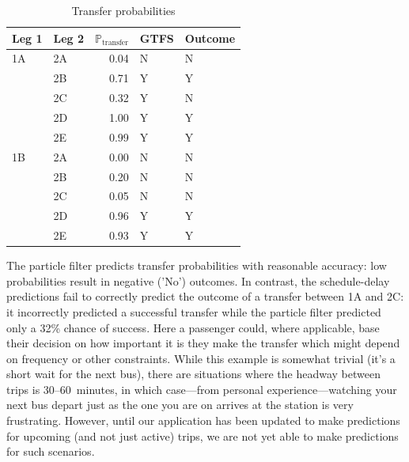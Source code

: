 \begin{knitrout}\small
{}\color{fgcolor}\begin{table}

\caption{\label{tab:eta_journey_transfer_res}Transfer probabilities}
\centering
\fontsize{8}{10}\selectfont
\begin{tabular}[t]{llrll}
\toprule
Leg 1 & Leg 2 & $\mathbb{P}_\text{transfer}$ & GTFS & Outcome\\
\midrule
1A & 2A & 0.04 & N & N\\
 & 2B & 0.71 & Y & Y\\
 & 2C & 0.32 & Y & N\\
 & 2D & 1.00 & Y & Y\\
 & 2E & 0.99 & Y & Y\\
\midrule
1B & 2A & 0.00 & N & N\\
 & 2B & 0.20 & N & N\\
 & 2C & 0.05 & N & N\\
 & 2D & 0.96 & Y & Y\\
 & 2E & 0.93 & Y & Y\\
\bottomrule
\end{tabular}
\end{table}


\end{knitrout}


The particle filter predicts transfer probabilities with reasonable accuracy: low probabilities result in negative ('No') outcomes. In contrast, the schedule-delay predictions fail to correctly predict the outcome of a transfer between 1A and 2C: it incorrectly predicted a successful transfer while the particle filter predicted only a 32\% chance of success. Here a passenger could, where applicable, base their decision on how important it is they make the transfer which might depend on frequency or other constraints. While this example is somewhat trivial (it's a short wait for the next bus), there are situations where the headway between trips is 30--60~minutes, in which case---from personal experience---watching your next bus depart just as the one you are on arrives at the station is very frustrating. However, until our application has been updated to make predictions for upcoming (and not just active) trips, we are not yet able to make predictions for such scenarios.


